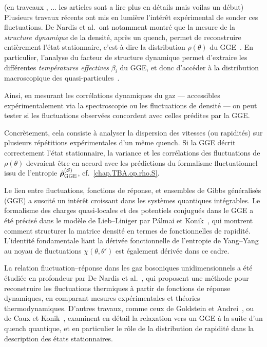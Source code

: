 {\color{blue} { \color{red} (en traveaux , ... les articles sont a lire plus en détails mais voilas un début)} 
\medskip
Plusieurs travaux récents ont mis en lumière l’intérêt expérimental de sonder ces fluctuations. De Nardis et al.\ ont notamment montré que la mesure de la \textit{structure dynamique} de la densité, après un quench, permet de reconstruire entièrement l’état stationnaire, c’est-à-dire la distribution \( \rho(\theta) \) du GGE~\cite{DeNardis2017}. En particulier, l’analyse du facteur de structure dynamique permet d’extraire les différentes \textit{températures effectives} \( \beta_i \) du GGE, et donc d’accéder à la distribution macroscopique des quasi-particules~\cite{Goldstein2013,CauxKonik2012}.

\medskip
Ainsi, en mesurant les corrélations dynamiques du gaz — accessibles expérimentalement via la spectroscopie ou les fluctuations de densité — on peut tester si les fluctuations observées concordent avec celles prédites par la GGE.

\medskip
Concrètement, cela consiste à analyser la dispersion des vitesses (ou rapidités) sur plusieurs répétitions expérimentales d’un même quench. Si la GGE décrit correctement l’état stationnaire, la variance et les corrélations des fluctuations de \( \rho(\theta) \) devraient être en accord avec les prédictions du formalisme fluctuationnel issu de l’entropie \( \hat{\bm{\rho}}^{(\mathcal{S})}_{\mathrm{GGE}} \), cf.~\eqref{chap.TBA.op.rho.S}.

\medskip
Le lien entre fluctuations, fonctions de réponse, et ensembles de Gibbs généralisés (GGE) a suscité un intérêt croissant dans les systèmes quantiques intégrables. Le formalisme des charges quasi-locales et des potentiels conjugués dans le GGE a été précisé dans le modèle de Lieb–Liniger par Pálmai et Konik~\cite{Palmai2018}, qui montrent comment structurer la matrice densité en termes de fonctionnelles de rapidité. L'identité fondamentale liant la dérivée fonctionnelle de l'entropie de Yang–Yang au noyau de fluctuations $\chi(\theta,\theta')$ est également dérivée dans ce cadre.

La relation fluctuation–réponse dans les gaz bosoniques unidimensionnels a été étudiée en profondeur par De Nardis et al.~\cite{DeNardis2017}, qui proposent une méthode pour reconstruire les fluctuations thermiques à partir de fonctions de réponse dynamiques, en comparant mesures expérimentales et théories thermodynamiques. D'autres travaux, comme ceux de Goldstein et Andrei~\cite{Goldstein2013}, ou de Caux et Konik~\cite{CauxKonik2012}, examinent en détail la relaxation vers un GGE à la suite d’un quench quantique, et en particulier le rôle de la distribution de rapidité dans la description des états stationnaires.

}

